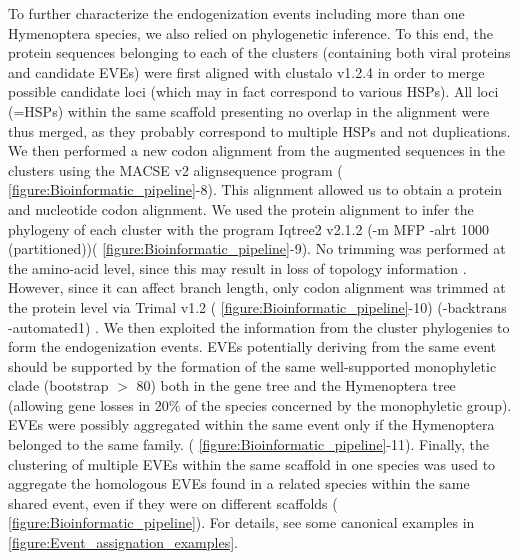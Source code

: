 To further characterize the endogenization events including more than one Hymenoptera species, we also relied on phylogenetic inference.  To this end, the protein sequences belonging to each of the clusters (containing both viral proteins and candidate EVEs) were first aligned with clustalo v1.2.4 \citep{sievers_fast_2011} in order to merge possible candidate loci (which may in fact correspond to various HSPs). All loci (=HSPs) within the same scaffold presenting no overlap in the alignment were thus merged, as they probably correspond to multiple HSPs and not duplications.  We then performed a new codon alignment from the augmented sequences in the clusters using the MACSE v2 alignsequence program \citep{ranwez_macse_2018} (\figurename{ \ref{figure:Bioinformatic_pipeline}}-8). This alignment allowed us to obtain a protein and nucleotide codon alignment. We used the protein alignment to infer the phylogeny of each cluster with the program Iqtree2 v2.1.2 \citep{minh_iq-tree_2020} (-m MFP -alrt 1000 (partitioned))(\figurename{ \ref{figure:Bioinformatic_pipeline}}-9).
No trimming was performed at the amino-acid level, since this may result in loss of topology information \citep{tan_current_2015,ranwez_chapter_2020}. However, since it can affect branch length, only codon alignment was trimmed at the protein level via Trimal v1.2 (\figurename{ \ref{figure:Bioinformatic_pipeline}}-10) (-backtrans -automated1) \citep{capella-gutierrez_trimal_2009}. 
We then exploited the information from the cluster phylogenies to form the endogenization events. EVEs potentially deriving from the same event should be supported by the formation of the same well-supported monophyletic clade (bootstrap $>$ 80) both in the gene tree and the Hymenoptera tree (allowing gene losses in 20\% of the species concerned by the monophyletic group). EVEs were possibly aggregated within the same event only if the Hymenoptera belonged to the same family.  (\figurename{ \ref{figure:Bioinformatic_pipeline}}-11). Finally, the clustering of multiple EVEs within the same scaffold in one species was used to aggregate the homologous EVEs found in a related species within the same shared event, even if they were on different scaffolds (\figurename{ \ref{figure:Bioinformatic_pipeline}}). For details, see some canonical examples in \figurename{ \ref{figure:Event_assignation_examples}}. 


